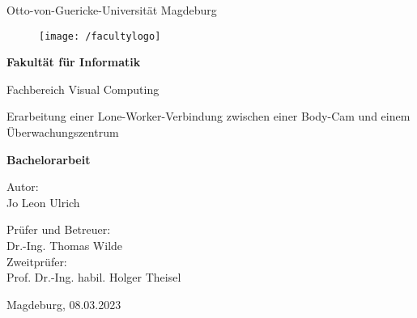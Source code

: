 \documentclass[thesis.tex]{subfiles}
\begin{document}
\thispagestyle {empty}

\begin{center}
\begin{Large}
Otto-von-Guericke-Universität Magdeburg\\

\begin{figure}
	\centering
	\texttt{[image: /facultylogo]}
	\label{fig:logoinffak}
\end{figure}

\vspace{3mm}

\textbf{Fakultät für Informatik}\\
\end{Large}

\vspace{3mm}

Fachbereich Visual Computing\\

\vspace{1cm}
\begin{Huge}
Erarbeitung einer Lone-Worker-Verbindung zwischen einer Body-Cam und einem Überwachungszentrum\\
\end{Huge}
\vspace{15mm}
{\Huge \textbf{Bachelorarbeit}}\\
\vspace{15mm}

Autor:\\
\vspace{4mm}
{\huge Jo Leon Ulrich}\\

\vspace{16mm}

Prüfer und Betreuer:\\
\vspace{2mm}
{\Large Dr.-Ing. Thomas Wilde}\\
\vspace{4mm}
Zweitprüfer:\\
\vspace{2mm}
{\Large Prof. Dr.-Ing. habil. Holger Theisel}\\
\vspace{10mm}


\vspace{25mm}

{\large Magdeburg, 08.03.2023}\\

\vspace{40mm}

\end{center}
\clearpage
\end{document}
